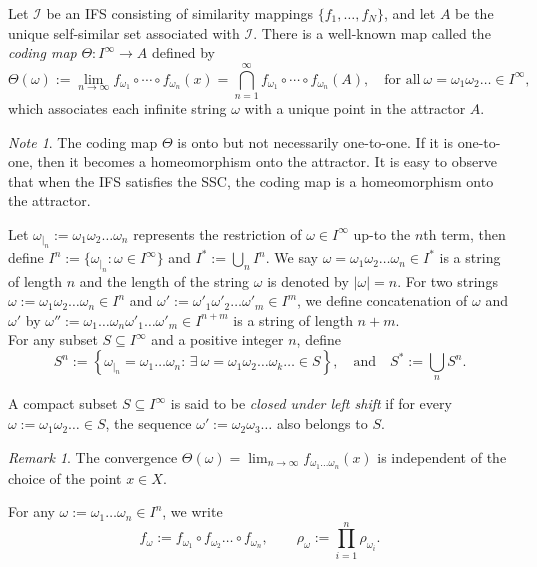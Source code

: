 \documentclass[12pt,oneside,reqno]{amsart}
\theoremstyle{definition}
\theoremstyle{remark}
\newtheorem{remark}[theorem]{Remark}
\newtheorem{note}[theorem]{Note}
\begin{document}
 Let $\mathcal{I}$ be an IFS consisting of similarity mappings $\{f_1, \ldots, f_N\}$, and let $A$ be the unique self-similar set associated with $\mathcal{I}$. There is a well-known map called the \emph{coding map} $\Theta: I^\infty \to A$ defined by
\[
\Theta(\omega) := \lim_{n \to \infty} f_{\omega_1} \circ \cdots \circ f_{\omega_n} (x) = \bigcap_{n=1}^{\infty} f_{\omega_1} \circ \cdots \circ f_{\omega_n}(A), \quad \text{for all}~ \omega = \omega_1 \omega_2 \dots \in I^{\infty},
\]
which associates each infinite string $\omega$ with a unique point in the attractor $A$.\\
\begin{note}
The coding map $\Theta$ is onto but not necessarily one-to-one. If it is one-to-one, then it becomes a homeomorphism onto the attractor. It is easy to observe that when the IFS satisfies the SSC, the coding map is a homeomorphism onto the attractor. 
\end{note}
Let $\omega_{|_n}:= \omega_1 \omega_2 \ldots \omega_n$ represents the restriction of $\omega \in I^{\infty}$ up-to the $n$th term, then define $I^n:=\{\omega_{|_n}: \omega \in I^{\infty}\}$ and $I^*:= \bigcup_n I^n.$ We say $\omega= \omega_1 \omega_2 \ldots \omega_n \in I^*$ is a string of length $n$ and the length of the string $\omega$ is denoted by $|\omega|=n$. For two strings $\omega:= \omega_1\omega_2\ldots \omega_n \in I^n$ and $\omega':= \omega'_1 \omega'_2 \ldots \omega'_m \in I^m$, we define concatenation of $\omega$ and $\omega'$ by $\omega'':= \omega_1\ldots \omega_n \omega'_1 \ldots \omega'_m \in I^{n+m}$ is a string of length $n+m.$\\

For any subset $S \subseteq I^\infty$ and a positive integer $n$, define
\[
S^n := \left\{ \omega_{|_n} = \omega_1 \dots \omega_n :\, \exists ~ \omega = \omega_1 \omega_2 \dots \omega_k \dots \in S \right\}, \quad \text{and} \quad S^* := \bigcup_{n} S^n.
\]

A compact subset $S \subseteq I^\infty$ is said to be \emph{closed under left shift} if for every $\omega := \omega_1 \omega_2 \dots \in S$, the sequence $\omega':= \omega_2 \omega_3 \dots$ also belongs to $S$. 

\begin{remark}
The convergence \(\Theta(\omega) = \lim_{n \to \infty} f_{\omega_1 \ldots \omega_n}(x)\) is independent of the choice of the point \(x \in X\).
\end{remark}

For any \(\omega := \omega_1 \dots \omega_n \in I^n\), we write
\[
f_{\omega} := f_{\omega_1} \circ f_{\omega_2} \dots \circ f_{\omega_n}, \qquad 
\rho_{\omega} := \prod_{i=1}^n \rho_{\omega_i}.
\]
\end{document}
